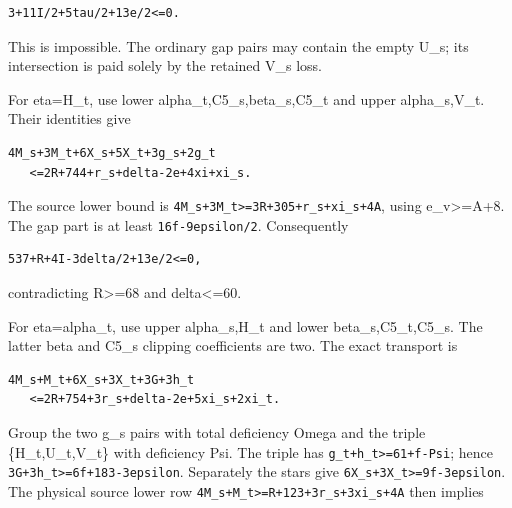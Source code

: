 \documentclass[10pt,a4paper]{article}
\theoremstyle{definition}
\begin{document}
\begin{lstlisting}
3+11I/2+5tau/2+13e/2<=0.
\end{lstlisting}

This is impossible. The ordinary gap pairs may contain the empty U\_\allowbreak{}s;
its intersection is paid solely by the retained V\_\allowbreak{}s loss.

For eta=\allowbreak{}H\_\allowbreak{}t,\allowbreak{} use lower alpha\_\allowbreak{}t,\allowbreak{}C5\_\allowbreak{}s,\allowbreak{}beta\_\allowbreak{}s,\allowbreak{}C5\_\allowbreak{}t and upper
alpha\_\allowbreak{}s,\allowbreak{}V\_\allowbreak{}t. Their identities give

\begin{lstlisting}
4M_s+3M_t+6X_s+5X_t+3g_s+2g_t
   <=2R+744+r_s+delta-2e+4xi+xi_s.
\end{lstlisting}

The source lower bound is
\texttt{4M\_\allowbreak{}\allowbreak{}s+\allowbreak{}3M\_\allowbreak{}\allowbreak{}t>=\allowbreak{}3R+\allowbreak{}305+\allowbreak{}r\_\allowbreak{}\allowbreak{}s+\allowbreak{}xi\_\allowbreak{}\allowbreak{}s+\allowbreak{}4A},\allowbreak{} using
e\_\allowbreak{}v\textgreater=\allowbreak{}A+\allowbreak{}8. The gap part is at least
\texttt{16f-9epsilon/\allowbreak{}2}. Consequently

\begin{lstlisting}
537+R+4I-3delta/2+13e/2<=0,
\end{lstlisting}

contradicting R\textgreater=\allowbreak{}68 and delta\textless=\allowbreak{}60.

For eta=\allowbreak{}alpha\_\allowbreak{}t,\allowbreak{} use upper alpha\_\allowbreak{}s,\allowbreak{}H\_\allowbreak{}t and lower beta\_\allowbreak{}s,\allowbreak{}C5\_\allowbreak{}t,\allowbreak{}C5\_\allowbreak{}s.
The latter beta and C5\_\allowbreak{}s clipping coefficients are two. The exact
transport is

\begin{lstlisting}
4M_s+M_t+6X_s+3X_t+3G+3h_t
   <=2R+754+3r_s+delta-2e+5xi_s+2xi_t.
\end{lstlisting}

Group the two g\_\allowbreak{}s pairs with total deficiency Omega and the triple
\{H\_\allowbreak{}t,\allowbreak{}U\_\allowbreak{}t,\allowbreak{}V\_\allowbreak{}t\} with deficiency Psi. The triple has
\texttt{g\_\allowbreak{}\allowbreak{}t+\allowbreak{}h\_\allowbreak{}\allowbreak{}t>=\allowbreak{}61+\allowbreak{}f-Psi}; hence
\texttt{3G+\allowbreak{}3h\_\allowbreak{}\allowbreak{}t>=\allowbreak{}6f+\allowbreak{}183-3epsilon}. Separately the
stars give \texttt{6X\_\allowbreak{}\allowbreak{}s+\allowbreak{}3X\_\allowbreak{}\allowbreak{}t>=\allowbreak{}9f-3epsilon}. The
physical source lower row
\texttt{4M\_\allowbreak{}\allowbreak{}s+\allowbreak{}M\_\allowbreak{}\allowbreak{}t>=\allowbreak{}R+\allowbreak{}123+\allowbreak{}3r\_\allowbreak{}\allowbreak{}s+\allowbreak{}3xi\_\allowbreak{}\allowbreak{}s+\allowbreak{}4A} then implies
\end{document}
